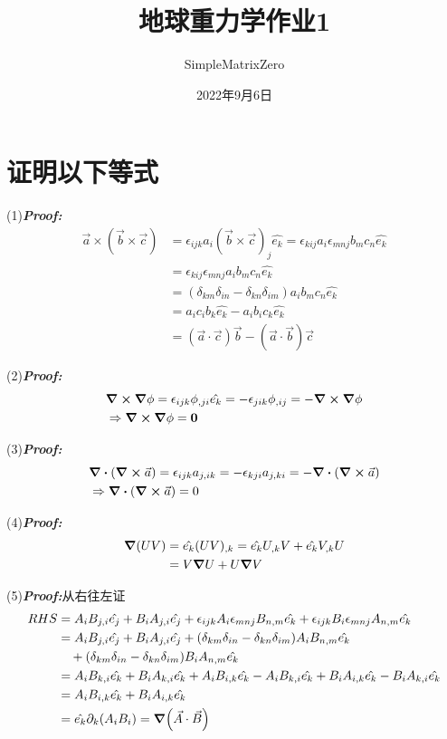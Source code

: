 \documentclass{article}
\title{地球重力学作业1}
\author{SimpleMatrixZero \quad 2000012440}
\date{2022年9月6日}
\begin{document}
\maketitle

\section{证明以下等式}
(1)\textbf{\it Proof:}
\begin{align*}
\vec{a}\times(\vec{b}\times\vec{c}) & =  \epsilon_{ijk}a_i(\vec{b}\times\vec{c})_j\hat{e_k} = \epsilon_{kij}a_i\epsilon_{mnj}b_m c_n \hat{e_k}\\
& = \epsilon_{kij}\epsilon_{mnj}a_i b_m c_n \hat{e_k}\\
& = (\delta_{km}\delta_{in} - \delta_{kn}\delta_{im}) a_i b_m c_n \hat{e_k}\\
& = a_i c_i b_k \hat{e_k} - a_i b_i c_k \hat{e_k}\\
& = (\vec{a}\cdot \vec{c})\vec{b} - (\vec{a}\cdot \vec{b})\vec{c}
\end{align*}

(2)\textbf{\it Proof:}
\begin{align*}
    &\curl \grad \phi = \epsilon_{ijk} \phi_{,ji} \hat{e_k} = -\epsilon_{jik} \phi_{,ij} = - \curl \grad \phi \\
    &\Rightarrow \curl \grad \phi = \mathbf{0}
\end{align*}

(3)\textbf{\it Proof:}
\begin{align*}
    &\div (\curl \vec{a}) = \epsilon_{ijk} a_{j,ik} = -\epsilon_{kji} a_{j,ki} = -  \div (\curl \vec{a}) \\
    &\Rightarrow \div (\curl \vec{a}) = 0
\end{align*}

(4)\textbf{\it Proof:}
\begin{align*}
    \grad(UV) &= \hat{e_k}(UV)_{,k} = \hat{e_k}U_{,k}V + \hat{e_k}V_{,k}U \\
    &= V \grad U + U \grad V
\end{align*}

(5)\textbf{\it Proof:}从右往左证
\begin{align*}
    RHS & =  A_i B_{j,i} \hat{e_j} + B_i A_{j,i} \hat{e_j} + \epsilon_{ijk} A_i \epsilon_{mnj} B_{n,m} \hat{e_k} + \epsilon_{ijk} B_i \epsilon_{mnj} A_{n,m} \hat{e_k} \\
    & = A_i B_{j,i} \hat{e_j} + B_i A_{j,i} \hat{e_j} + (\delta_{km}\delta_{in} - \delta_{kn}\delta_{im})A_i B_{n,m} \hat{e_k} \\
    & \quad + (\delta_{km}\delta_{in} - \delta_{kn}\delta_{im})B_i A_{n,m} \hat{e_k}\\
    & = A_i B_{k,i} \hat{e_k} + B_i A_{k,i} \hat{e_k} + A_i B_{i,k} \hat{e_k} - A_i B_{k,i} \hat{e_k} + B_i A_{i,k} \hat{e_k} - B_i A_{k,i} \hat{e_k}\\
    & = A_i B_{i,k} \hat{e_k} + B_i A_{i,k} \hat{e_k} \\
    & = \hat{e_k} \partial_k (A_i B_i) = \grad (\vec{A}\cdot \vec{B})
\end{align*}
\end{document}
